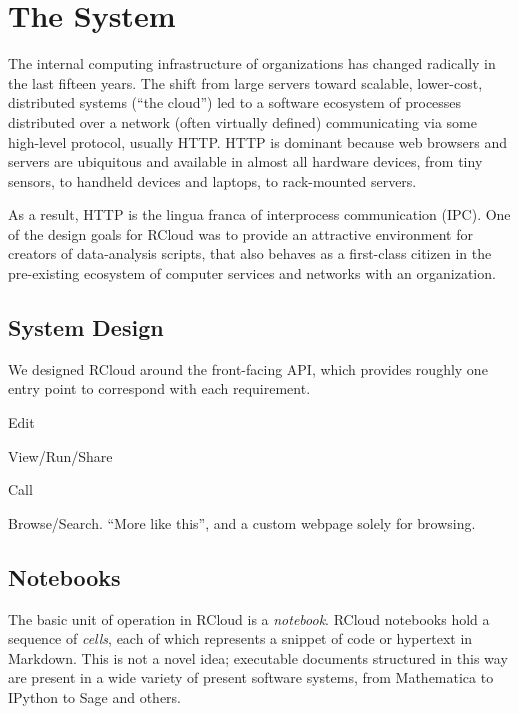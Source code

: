 \section{The System\label{sec:system}}


The internal computing infrastructure of organizations has changed
radically in the last fifteen years. The shift from large
servers toward scalable, lower-cost, distributed systems (``the cloud'')
led to a software ecosystem of processes distributed over a
network (often virtually defined) communicating via some
high-level protocol, usually HTTP.  HTTP is dominant because web
browsers and servers are ubiquitous and available in almost
all hardware devices, from tiny sensors, to handheld devices and
laptops, to rack-mounted servers.

As a result, HTTP is the lingua franca of interprocess communication
(IPC). One of the design goals for RCloud was to provide an attractive
environment for creators of data-analysis scripts, that also behaves
as a first-class citizen in the pre-existing ecosystem of computer
services and networks with an organization.


\subsection{System Design}

We designed RCloud around the front-facing API, which provides roughly
one entry point to correspond with each requirement.

Edit

View/Run/Share

Call

Browse/Search. ``More like this'', and a custom webpage solely for browsing.

\subsection{Notebooks\label{sec:notebooks}}

The basic unit of operation in RCloud is a \emph{notebook}. RCloud
notebooks hold a sequence of \emph{cells}, each of which represents a
snippet of code or hypertext in Markdown. This is not a novel idea;
executable documents structured in this way are present in a wide
variety of present software systems, from Mathematica to IPython to
Sage and others.

